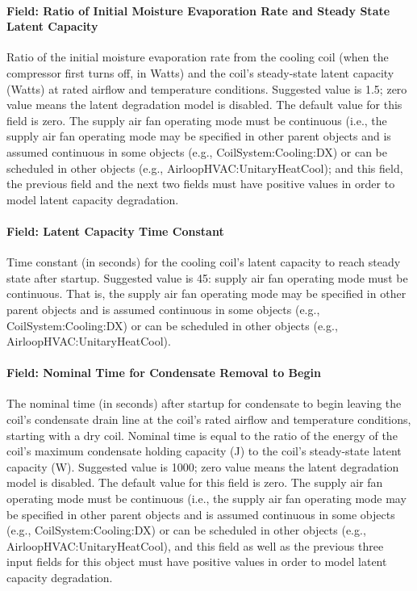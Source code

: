 \paragraph{Field: Ratio of Initial Moisture Evaporation Rate and Steady State Latent Capacity}

Ratio of the initial moisture evaporation rate from the cooling coil (when the compressor first turns off, in Watts) and the coil's steady-state latent capacity (Watts) at rated airflow and temperature conditions. Suggested value is 1.5; zero value means the latent degradation model is disabled. The default value for this field is zero. The supply air fan operating mode must be continuous (i.e., the supply air fan operating mode may be specified in other parent objects and is assumed continuous in some objects (e.g., CoilSystem:Cooling:DX) or can be scheduled in other objects (e.g., AirloopHVAC:UnitaryHeatCool); and this field, the previous field and the next two fields must have positive values in order to model latent capacity degradation.

\paragraph{Field: Latent Capacity Time Constant}

Time constant (in seconds) for the cooling coil's latent capacity to reach steady state after startup. Suggested value is 45: supply air fan operating mode must be continuous. That is, the supply air fan operating mode may be specified in other parent objects and is assumed continuous in some objects (e.g., CoilSystem:Cooling:DX) or can be scheduled in other objects (e.g., AirloopHVAC:UnitaryHeatCool).

\paragraph{Field: Nominal Time for Condensate Removal to Begin}

The nominal time (in seconds) after startup for condensate to begin leaving the coil's condensate drain line at the coil's rated airflow and temperature conditions, starting with a dry coil. Nominal time is equal to the ratio of the energy of the coil's maximum condensate holding capacity (J) to the coil's steady-state latent capacity (W). Suggested value is 1000; zero value means the latent degradation model is disabled. The default value for this field is zero. The supply air fan operating mode must be continuous (i.e., the supply air fan operating mode may be specified in other parent objects and is assumed continuous in some objects (e.g., CoilSystem:Cooling:DX) or can be scheduled in other objects (e.g., AirloopHVAC:UnitaryHeatCool), and this field as well as the previous three input fields for this object must have positive values in order to model latent capacity degradation.

